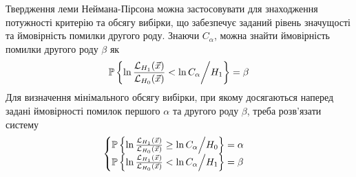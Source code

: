 Твердження леми Неймана-Пірсона можна застосовувати для знаходження потужності критерію та обсягу вибірки, що забезпечує заданий рівень значущості та ймовірність помилки другого роду.
Знаючи $C_{\alpha}$, можна знайти ймовірність помилки другого роду $\beta$ як
\begin{gather*}
    \P \left\{ \ln \frac{\mathcal{L}_{H_1}(\vec{x})}{\mathcal{L}_{H_0}(\vec{x})} < \ln C_{\alpha} \middle/ H_1\right\} = \beta
\end{gather*}
Для визначення мінімального обсягу вибірки, при якому досягаються наперед задані ймовірності помилок першого $\alpha$ та другого роду $\beta$,
треба розв'язати систему
\begin{gather*}
    \begin{cases}
        \P \left\{ \ln \frac{\mathcal{L}_{H_1}(\vec{x})}{\mathcal{L}_{H_0}(\vec{x})} \geq \ln C_{\alpha} \middle/ H_0\right\} = \alpha \\
        \P \left\{ \ln \frac{\mathcal{L}_{H_1}(\vec{x})}{\mathcal{L}_{H_0}(\vec{x})} < \ln C_{\alpha} \middle/ H_1 \right\} = \beta
    \end{cases}
\end{gather*}

